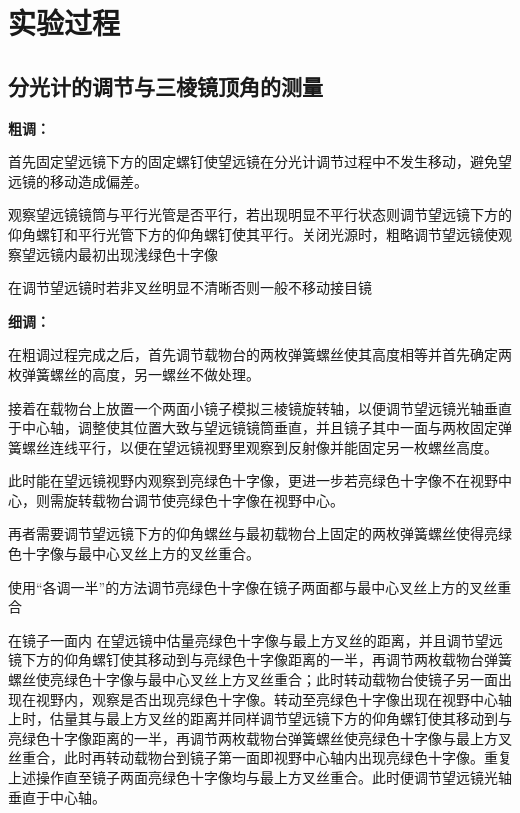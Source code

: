 \documentclass[UTF8]{ctexart}
\title{}
\author{}
\date{}
\begin{document}
\begin{titlepage}		
		
\end{titlepage}

\section{实验过程}   %
\subsection{分光计的调节与三棱镜顶角的测量}

\textbf{粗调：}

首先固定望远镜下方的固定螺钉使望远镜在分光计调节过程中不发生移动，避免望远镜的移动造成偏差。

观察望远镜镜筒与平行光管是否平行，若出现明显不平行状态则调节望远镜下方的仰角螺钉和平行光管下方的仰角螺钉使其平行。关闭光源时，粗略调节望远镜使观察望远镜内最初出现浅绿色十字像

在调节望远镜时若非叉丝明显不清晰否则一般不移动接目镜

\textbf{细调：}

在粗调过程完成之后，首先调节载物台的两枚弹簧螺丝使其高度相等并首先确定两枚弹簧螺丝的高度，另一螺丝不做处理。

接着在载物台上放置一个两面小镜子模拟三棱镜旋转轴，以便调节望远镜光轴垂直于中心轴，调整使其位置大致与望远镜镜筒垂直，并且镜子其中一面与两枚固定弹簧螺丝连线平行，以便在望远镜视野里观察到反射像并能固定另一枚螺丝高度。

此时能在望远镜视野内观察到亮绿色十字像，更进一步若亮绿色十字像不在视野中心，则需旋转载物台调节使亮绿色十字像在视野中心。

再者需要调节望远镜下方的仰角螺丝与最初载物台上固定的两枚弹簧螺丝使得亮绿色十字像与最中心叉丝上方的叉丝重合。

使用“各调一半”的方法调节亮绿色十字像在镜子两面都与最中心叉丝上方的叉丝重合

在镜子一面内 在望远镜中估量亮绿色十字像与最上方叉丝的距离，并且调节望远镜下方的仰角螺钉使其移动到与亮绿色十字像距离的一半，再调节两枚载物台弹簧螺丝使亮绿色十字像与最中心叉丝上方叉丝重合；此时转动载物台使镜子另一面出现在视野内，观察是否出现亮绿色十字像。转动至亮绿色十字像出现在视野中心轴上时，估量其与最上方叉丝的距离并同样调节望远镜下方的仰角螺钉使其移动到与亮绿色十字像距离的一半，再调节两枚载物台弹簧螺丝使亮绿色十字像与最上方叉丝重合，此时再转动载物台到镜子第一面即视野中心轴内出现亮绿色十字像。重复上述操作直至镜子两面亮绿色十字像均与最上方叉丝重合。此时便调节望远镜光轴垂直于中心轴。
\end{document}
